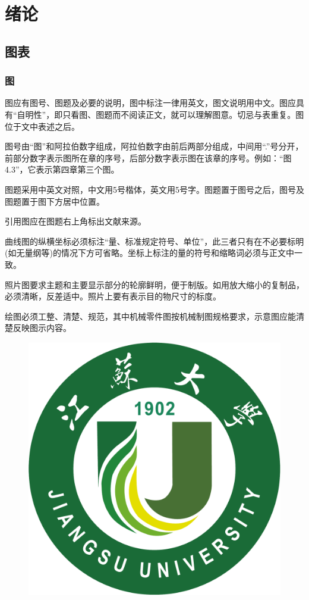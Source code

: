\chapter{绪论}

\section{图表}
\subsection{图}
图应有图号、图题及必要的说明，图中标注一律用英文，图文说明用中文。图应具有“自明性”，即只看图、图题而不阅读正文，就可以理解图意。切忌与表重复。图位于文中表述之后。

图号由“图”和阿拉伯数字组成，阿拉伯数字由前后两部分组成，中间用“.”号分开，前部分数字表示图所在章的序号，后部分数字表示图在该章的序号。例如：“图4.3”，它表示第四章第三个图。

图题采用中英文对照，中文用5号楷体，英文用5号字。图题置于图号之后，图号及图题置于图下方居中位置。

引用图应在图题右上角标出文献来源。

曲线图的纵横坐标必须标注“量、标准规定符号、单位”，此三者只有在不必要标明(如无量纲等)的情况下方可省略。坐标上标注的量的符号和缩略词必须与正文中一致。

照片图要求主题和主要显示部分的轮廓鲜明，便于制版。如用放大缩小的复制品，必须清晰，反差适中。照片上要有表示目的物尺寸的标度。

绘图必须工整、清楚、规范，其中机械零件图按机械制图规格要求，示意图应能清楚反映图示内容。

\begin{figure}[!ht]
	\centering
	{\includegraphics[scale=0.1]{Figures/logo/ujslogo.pdf}}
	\label{Jiangsu University}
\end{figure}


